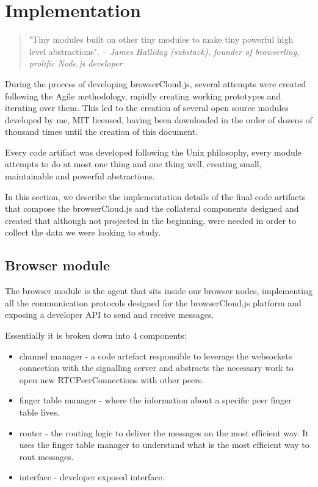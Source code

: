 \chapter{Implementation}\label{ch:implemenation}

\begin{quotation}
"Tiny modules built on other tiny modules to make tiny powerful high level abstractions".
{\small\it -- James Halliday (substack), founder of browserling, prolific Node.js developer}
\end{quotation}

During the process of developing browserCloud.js, several attempts were created following the Agile methodology, rapidly creating working prototypes and iterating over them. This led to the creation of several open source modules developed by me, MIT licensed, having been downloaded in the order of dozens of thousand times until the creation of this document.

Every code artifact was developed following the Unix philosophy, every module attempts to do at most one thing and one thing well, creating small, maintainable and powerful abstractions.

In this section, we describe the implementation details of the final code artifacts that compose the browserCloud.js and the collateral components designed and created that although not projected in the beginning, were needed in order to collect the data we were looking to study.

\section{Browser module}

The browser module is the agent that sits inside our browser nodes, implementing all the communication protocols designed for the browserCloud.js platform and exposing a developer API to send and receive messages.

Essentially it is broken down into 4 components:

\begin{itemize}
    \item channel manager - a code artefact responsible to leverage the websockets connection with the signalling server and abstracts the necessary work to open new RTCPeerConnections with other peers.
    \item finger table manager - where the information about a specific peer finger table lives.
    \item router - the routing logic to deliver the messages on the most efficient way. It uses the finger table manager to understand what is the most efficient way to rout messages.
    \item interface - developer exposed interface.
\end{itemize}

